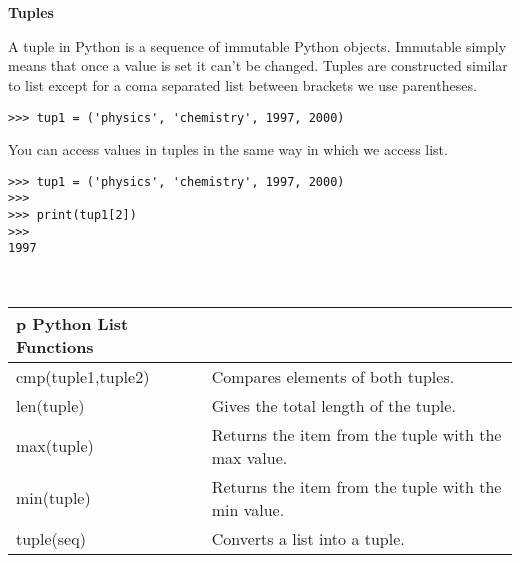 \documentclass[letterpaper,11pt]{article}
\begin{document}
\\ \\
\textbf{Tuples}
\par{A tuple in Python is a sequence of immutable Python objects. Immutable
simply means that once a value is set it can't be changed. Tuples are
constructed similar to list except for a coma separated list between brackets we
use parentheses.}
\\
\begin{minipage}{.5\textwidth}
    \begin{tcolorbox}
        \begin{footnotesize}
            \begin{verbatim}
>>> tup1 = ('physics', 'chemistry', 1997, 2000)
            \end{verbatim}
        \end{footnotesize}
    \end{tcolorbox}
\end{minipage}
\par{You can access values in tuples in the same way in which we access list.}
\\
\begin{minipage}{.5\textwidth}
    \begin{tcolorbox}
        \begin{footnotesize}
            \begin{verbatim}
>>> tup1 = ('physics', 'chemistry', 1997, 2000)
>>>
>>> print(tup1[2])
>>>
1997
            \end{verbatim}
        \end{footnotesize}
    \end{tcolorbox}
\end{minipage}
\\
\begin{tabular}[t]{l l}p
    \textbf{Python List Functions}  \\
    \hline
    cmp(tuple1,tuple2) & Compares elements of both tuples.                   \\
    len(tuple)         & Gives the total length of the tuple.                \\
    max(tuple)         & Returns the item from the tuple with the max value. \\
    min(tuple)         & Returns the item from the tuple with the min value. \\
    tuple(seq)         & Converts a list into a tuple.                       \\
\end{tabular}
\end{document}
